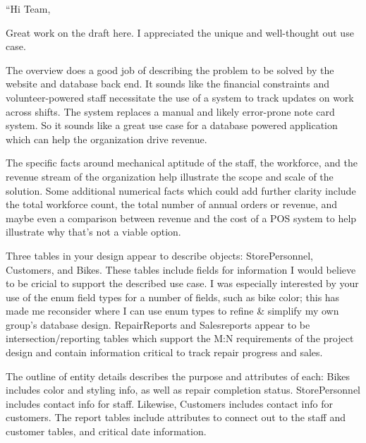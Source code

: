 \documentclass{article}
\begin{document}
\begin{tcolorbox}[colback=secondarycolor, colframe=primarycolor, title=\textbf{Peer Review 2 - Andrew Mathena}]
``Hi Team,

\vspace{0.2cm}

Great work on the draft here. I appreciated the unique and well-thought out use case. 

\vspace{0.2cm}

The overview does a good job of describing the problem to be solved by the website and database back end. It sounds like the financial constraints and volunteer-powered staff necessitate the use of a system to track updates on work across shifts. The system replaces a manual and likely error-prone note card system. So it sounds like a great use case for a database powered application which can help the organization drive revenue.

\vspace{0.2cm}

The specific facts around mechanical aptitude of the staff, the workforce, and the revenue stream of the organization help illustrate the scope and scale of the solution. Some additional numerical facts which could add further clarity include the total workforce count, the total number of annual orders or revenue, and maybe even a comparison between revenue and the cost of a POS system to help illustrate why that's not a viable option.

\vspace{0.2cm}

Three tables in your design appear to describe objects: StorePersonnel, Customers, and Bikes. These tables include fields for information I would believe to be cricial to support the described use case. I was especially interested by your use of the enum field types for a number of fields, such as bike color; this has made me reconsider where I can use enum types to refine \& simplify my own group's database design. RepairReports and Salesreports appear to be intersection/reporting tables which support the M:N requirements of the project design and contain information critical to track repair progress and sales.

\vspace{0.2cm}

The outline of entity details describes the purpose and attributes of each: Bikes includes color and styling info, as well as repair completion status. StorePersonnel includes contact info for staff. Likewise, Customers includes contact info for customers. The report tables include attributes to connect out to the staff and customer tables, and critical date information.


\end{tcolorbox}
\end{document}
